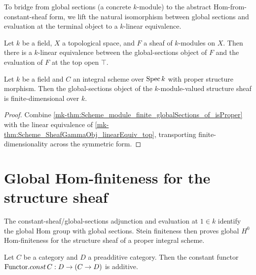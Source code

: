 To bridge from global sections (a concrete \(k\)-module) to the abstract Hom-from-constant-sheaf form, we lift the natural isomorphism between global sections and evaluation at the terminal object to a \(k\)-linear equivalence.

\begin{theorem}\label{mk-thm:Scheme_SheafGammaObj_linearEquiv_top}
  \leanok


  Let \(k\) be a field, \(X\) a topological space, and \(F\) a sheaf of \(k\)-modules on \(X\). Then there is a \(k\)-linear equivalence between the global-sections object of \(F\) and the evaluation of \(F\) at the top open \(\top\).
\end{theorem}

\begin{theorem}\label{mk-thm:Scheme_module_finite_gammaObj_of_isProper}
  \leanok

  Let \(k\) be a field and \(C\) an integral scheme over \(\operatorname{Spec} k\) with proper structure morphism. Then the global-sections object of the \(k\)-module-valued structure sheaf is finite-dimensional over \(k\).
\end{theorem}

\begin{proof}
  \leanok

  Combine \ref{mk-thm:Scheme_module_finite_globalSections_of_isProper} with the linear equivalence of \ref{mk-thm:Scheme_SheafGammaObj_linearEquiv_top}, transporting finite-dimensionality across the symmetric form.
\end{proof}

\section{Global Hom-finiteness for the structure sheaf}
\label{mk-sec:IsHModuleHomFinite_producer}

The constant-sheaf/global-sections adjunction and evaluation at \(1\in k\) identify the global Hom group with global sections. Stein finiteness then proves global \(H^0\) Hom-finiteness for the structure sheaf of a proper integral scheme.

\begin{lemma}\label{mk-lem:Functor_const_additive}
  \leanok

  Let \(C\) be a category and \(D\) a preadditive category. Then the constant functor
  \(\mathrm{Functor}.const\, C : D \to (C \to D)\) is additive.
\end{lemma}

